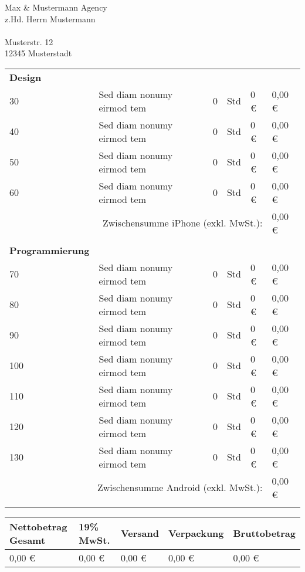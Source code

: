 \documentclass[DIN, pagenumber=footmiddle, parskip=half,
	fromalign=right,  %
	fromphone=true, fromfax=false,
	fromrule=false]{scrlttr2}
\begin{document}
\begin{letter}{
	Max \& Mustermann Agency\\ 
	z.Hd. Herrn Mustermann\\ \ \\
	Musterstr. 12\\
	12345 Musterstadt
}
\begin{longtable}{p{2.5cm}p{5.5cm}p{1cm}p{1cm}p{2.5cm}p{2.5cm}}
	\textbf{Design}\\
	30 & Sed diam nonumy eirmod tem & 0 & Std & 0 \euro{} & 0,00 \euro{}\\
	40 & Sed diam nonumy eirmod tem & 0 & Std & 0 \euro{} & 0,00 \euro{}\\
	50 & Sed diam nonumy eirmod tem & 0 & Std & 0 \euro{} & 0,00 \euro{}\\
	60 & Sed diam nonumy eirmod tem & 0 & Std & 0 \euro{} & 0,00 \euro{}\\
	\multicolumn{5}{r}{Zwischensumme iPhone (exkl. MwSt.):} & 0,00 \euro{}\\
	\\
	
	\textbf{Programmierung}\\
	70 & Sed diam nonumy eirmod tem & 0 & Std & 0 \euro{} & 0,00 \euro{}\\
	80 & Sed diam nonumy eirmod tem & 0 & Std & 0 \euro{} & 0,00 \euro{}\\
	90 & Sed diam nonumy eirmod tem & 0 & Std & 0 \euro{} & 0,00 \euro{}\\
	100 & Sed diam nonumy eirmod tem & 0 & Std & 0 \euro{} & 0,00 \euro{}\\
	110 & Sed diam nonumy eirmod tem & 0 & Std & 0 \euro{} & 0,00 \euro{}\\
	120 & Sed diam nonumy eirmod tem & 0 & Std & 0 \euro{} & 0,00 \euro{}\\
	130 & Sed diam nonumy eirmod tem & 0 & Std & 0 \euro{} & 0,00 \euro{}\\
	\multicolumn{5}{r}{Zwischensumme Android (exkl. MwSt.):} & 0,00 \euro{}\\
	\\
	
	\hline\hline 
\end{longtable}

\begin{longtable}{p{5.5cm}p{2.5cm}p{2.5cm}p{2cm}p{3cm}}
	\hline Nettobetrag Gesamt & 19\% MwSt. & Versand & Verpackung & Bruttobetrag\\
	\hline 
	0,00 \euro{} & 0,00 \euro & 0,00 \euro & 0,00 \euro & 0,00 \euro{}\\
	\hline\hline 	
\end{longtable}


\end{letter}
\end{document}
